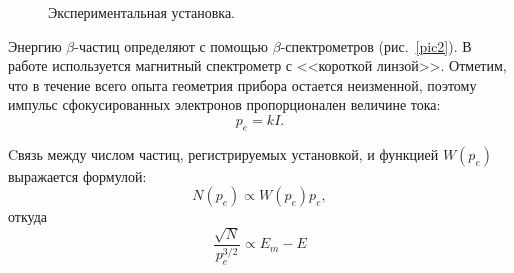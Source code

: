 \documentclass[a4paper,12pt]{article} %
\begin{document}
	
	\begin{figure}[h!]
		{\caption{Экспериментальная установка.}}
	\end{figure}
	
	Энергию $\beta$-частиц определяют с помощью $\beta$-спектрометров (рис.~\ref{pic2}). В работе используется магнитный спектрометр с <<короткой линзой>>. Отметим, что в течение всего опыта геометрия прибора остается неизменной, поэтому импульс сфокусированных электронов пропорционален величине тока:
	\begin{equation}
		\label{eq:pkI}
		\tag{$\star$}
		p_e = kI.
	\end{equation}
	
	Cвязь между числом частиц, регистрируемых установкой, и функцией $W(p_e)$ выражается формулой:
	\begin{equation*}
		N(p_e) \propto W(p_e)p_e,
	\end{equation*}
	откуда
	\begin{equation}
		\label{eq:fermi}
		\tag{$\star \star$}
		\frac{\sqrt{N}}{p_e^{3/2}} \propto E_m - E
	\end{equation}
	
	
\end{document}
